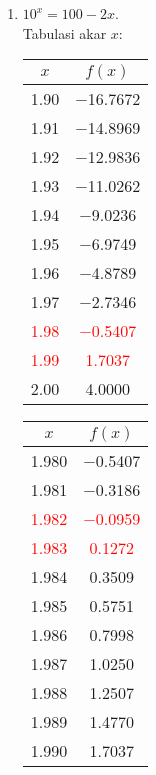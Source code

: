 \documentclass{article}
\begin{document}
\begin{enumerate}
\begin{enumerate}
        \item $10^x = 100 - 2x$. \\
        Tabulasi akar $x$: \\
        \begin{tabular}{|c|c|}
            \hline
            $x$   & $f(x)$ \\
            \hline
            \num{1,90} & \num{-16,7672} \\
            \num{1,91} & \num{-14,8969} \\
            \num{1,92} & \num{-12,9836} \\
            \num{1,93} & \num{-11,0262} \\
            \num{1,94} & \num{-9,0236} \\
            \num{1,95} & \num{-6,9749} \\
            \num{1,96} & \num{-4,8789} \\
            \num{1,97} & \num{-2,7346} \\
            \textcolor{red}{\num{1,98}} & \textcolor{red}{\num{-0,5407}} \\
            \textcolor{red}{\num{1,99}} & \textcolor{red}{\num{1,7037}} \\
            \num{2,00} & \num{4,0000} \\
            \hline
            \end{tabular}\quad
            \begin{tabular}{|c|c|}
            \hline
            $x$   & $f(x)$ \\
            \hline
            \num{1,980} & \num{-0,5407} \\
            \num{1,981} & \num{-0,3186} \\
            \textcolor{red}{\num{1,982}} & \textcolor{red}{\num{-0,0959}} \\
            \textcolor{red}{\num{1,983}} & \textcolor{red}{\num{0,1272}} \\
            \num{1,984} & \num{0,3509} \\
            \num{1,985} & \num{0,5751} \\
            \num{1,986} & \num{0,7998} \\
            \num{1,987} & \num{1,0250} \\
            \num{1,988} & \num{1,2507} \\
            \num{1,989} & \num{1,4770} \\
            \num{1,990} & \num{1,7037} \\
            \hline

\end{tabular}
\end{enumerate}
\end{enumerate}
\end{document}
